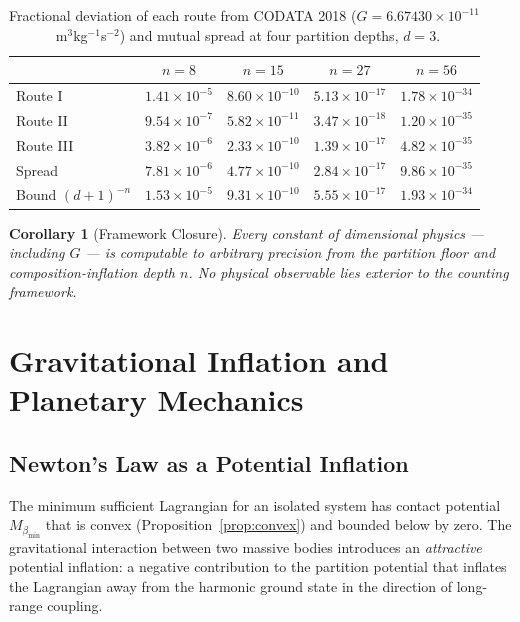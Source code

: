 \documentclass[11pt,twocolumn,a4paper]{article}
\theoremstyle{plain}
\newtheorem{corollary}[theorem]{Corollary}
\theoremstyle{definition}
\theoremstyle{remark}
\newcommand{\bmin}{\beta_{\min}}
\begin{document}
\begin{table}[h]
\centering
\small
\caption{Fractional deviation of each route from CODATA 2018
($G = 6.67430\times 10^{-11}$~m$^3$kg$^{-1}$s$^{-2}$) and mutual spread
at four partition depths, $d = 3$.}
\label{tab:g_routes}
\begin{tabular}{lcccc}
\toprule
 & $n = 8$ & $n = 15$ & $n = 27$ & $n = 56$ \\
\midrule
Route I   & $1.41\times10^{-5}$  & $8.60\times10^{-10}$  & $5.13\times10^{-17}$  & $1.78\times10^{-34}$ \\
Route II  & $9.54\times10^{-7}$  & $5.82\times10^{-11}$  & $3.47\times10^{-18}$  & $1.20\times10^{-35}$ \\
Route III & $3.82\times10^{-6}$  & $2.33\times10^{-10}$  & $1.39\times10^{-17}$  & $4.82\times10^{-35}$ \\
\midrule
Spread    & $7.81\times10^{-6}$  & $4.77\times10^{-10}$  & $2.84\times10^{-17}$  & $9.86\times10^{-35}$ \\
Bound $(d{+}1)^{-n}$ & $1.53\times10^{-5}$ & $9.31\times10^{-10}$ & $5.55\times10^{-17}$ & $1.93\times10^{-34}$ \\
\bottomrule
\end{tabular}
\end{table}

\begin{corollary}[Framework Closure]
\label{cor:closure}
Every constant of dimensional physics --- including $G$ --- is computable to
arbitrary precision from the partition floor and composition-inflation depth
$n$. No physical observable lies exterior to the counting framework.
\end{corollary}

\section{Gravitational Inflation and Planetary Mechanics}
\label{sec:planetary}

\subsection{Newton's Law as a Potential Inflation}

The minimum sufficient Lagrangian for an isolated system has contact potential
$M_{\bmin}$ that is convex (Proposition~\ref{prop:convex}) and bounded below
by zero. The gravitational interaction between two massive bodies introduces an
\emph{attractive} potential inflation: a negative contribution to the partition
potential that inflates the Lagrangian away from the harmonic ground state in
the direction of long-range coupling.
\end{document}
